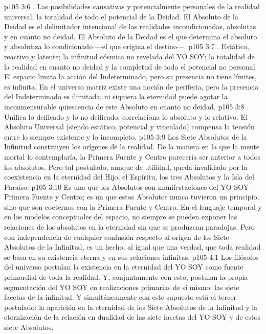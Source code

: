 \vs p105 3:6 . Las posibilidades causativas y potencialmente personales de la realidad universal, la totalidad de todo el potencial de la Deidad. El Absoluto de la Deidad es el delimitador intencional de las realidades incondicionadas, absolutas y en cuanto no deidad. El Absoluto de la Deidad es el que determina el absoluto y absolutiza lo condicionado ---el que origina el destino---.
\vs p105 3:7 . Estático, reactivo y latente; la infinitud cósmica no revelada del YO SOY; la totalidad de la realidad en cuanto no deidad y la completud de todo el potencial no personal. El espacio limita la acción del Indeterminado, pero su presencia no tiene límites, es infinita. En el universo matriz existe una noción de periferia, pero la presencia del Indeterminado es ilimitada; ni siquiera la eternidad puede agotar la inconmensurable quiescencia de este Absoluto en cuanto no deidad.
\vs p105 3:8 . Unifica lo deificado y lo no deificado; correlaciona lo absoluto y lo relativo. El Absoluto Universal (siendo estático, potencial y vinculado) compensa la tensión entre lo siempre existente y lo incompleto.
\vs p105 3:9 \pc Los Siete Absolutos de la Infinitud constituyen los orígenes de la realidad. De la manera en la que la mente mortal lo contemplaría, la Primera Fuente y Centro parecería ser anterior a todos los absolutos. Pero tal postulado, aunque de utilidad, queda invalidado por la coexistencia en la eternidad del Hijo, el Espíritu, los tres Absolutos y la Isla del Paraíso.
\vs p105 3:10 Es una  que los Absolutos son manifestaciones del YO SOY\hyp{}Primera Fuente y Centro; es un  que estos Absolutos nunca tuvieron un principio, sino que son coeternos con la Primera Fuente y Centro. En el lenguaje temporal y en los modelos conceptuales del espacio, no siempre se pueden exponer las relaciones de los absolutos en la eternidad sin que se produzcan paradojas. Pero con independencia de cualquier confusión respecto al origen de los Siete Absolutos de la Infinitud, es un hecho, al igual que una verdad, que toda realidad se basa en su existencia eterna y en sus relaciones infinitas.
\vs p105 4:1 Los filósofos del universo postulan la existencia en la eternidad del YO SOY como fuente primordial de toda la realidad. Y, conjuntamente con esto, postulan la propia segmentación del YO SOY en realizaciones primarias de sí mismo: las siete facetas de la infinitud. Y simultáneamente con este supuesto está el tercer postulado: la aparición en la eternidad de los Siete Absolutos de la Infinitud y la eternización de la relación en dualidad de las siete facetas del YO SOY y de estos siete Absolutos.
